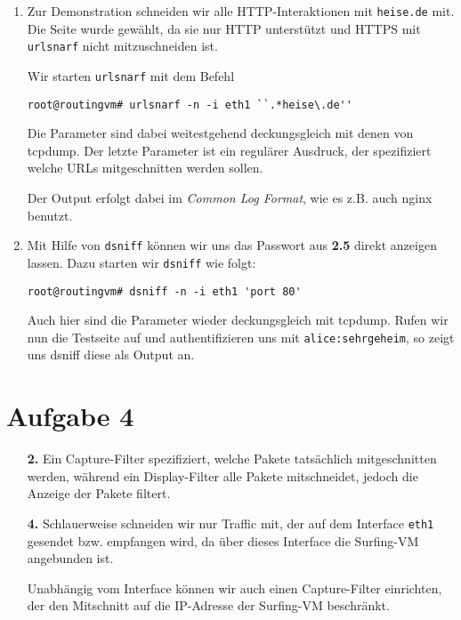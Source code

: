 \documentclass[10pt,a4paper]{article}
\begin{document}
\begin{enumerate}[\bf 1.]
        \item Zur Demonstration schneiden wir alle HTTP-Interaktionen mit \texttt{heise.de}
              mit. Die Seite wurde gewählt, da sie nur HTTP unterstützt und HTTPS
              mit \texttt{urlsnarf} nicht mitzuschneiden ist.

              Wir starten \texttt{urlsnarf} mit dem Befehl
              \begin{lstlisting}[style=BashInputStyle]
root@routingvm# urlsnarf -n -i eth1 ``.*heise\.de''
              \end{lstlisting}

              Die Parameter sind dabei weitestgehend deckungsgleich mit denen
              von tcpdump. Der letzte Parameter ist ein regulärer Ausdruck, der
              spezifiziert welche URLs mitgeschnitten werden sollen.

              Der Output erfolgt dabei im \textit{Common Log Format}, wie es z.B.
              auch nginx benutzt.

        \item Mit Hilfe von \texttt{dsniff} können wir uns das Passwort aus \textbf{2.5}
              direkt anzeigen lassen. Dazu starten wir \texttt{dsniff} wie folgt:

              \begin{lstlisting}[style=BashInputStyle]
root@routingvm# dsniff -n -i eth1 'port 80'
              \end{lstlisting}

              Auch hier sind die Parameter wieder deckungsgleich mit tcpdump.
              Rufen wir nun die Testseite auf und authentifizieren uns mit
              \texttt{alice:sehrgeheim}, so zeigt uns dsniff diese als Output an.
    \end{enumerate}

\section*{Aufgabe 4}
\setcounter{subsection}{0}

\begin{enumerate}[\bf 1.]
        \item[\bf 2.] Ein Capture-Filter spezifiziert, welche Pakete tatsächlich
                      mitgeschnitten werden, während ein Display-Filter alle
                      Pakete mitschneidet, jedoch die Anzeige der Pakete filtert.

        \item[\bf 4.] Schlauerweise schneiden wir nur Traffic mit, der auf dem
                      Interface \texttt{eth1} gesendet bzw. empfangen wird,
                      da über dieses Interface die Surfing-VM angebunden ist.

                      Unabhängig vom Interface können wir auch einen Capture-Filter
                      einrichten, der den Mitschnitt auf die IP-Adresse der
                      Surfing-VM beschränkt.
    \end{enumerate}
\end{document}
